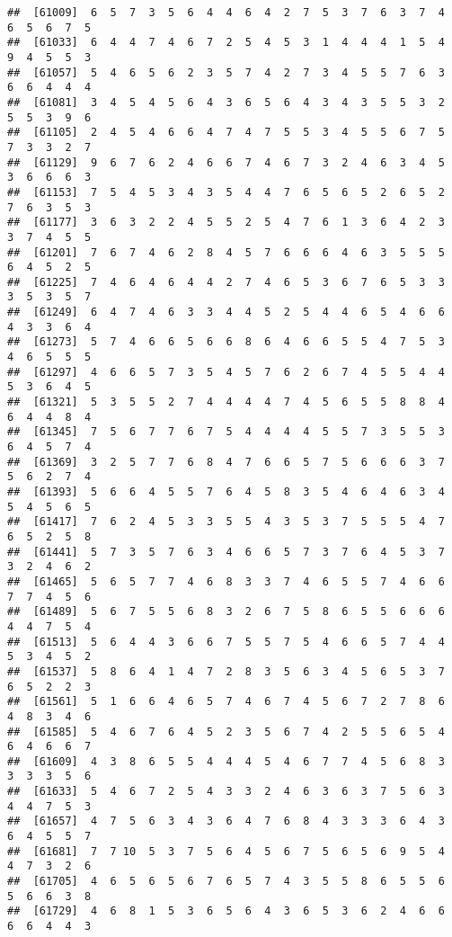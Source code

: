 \documentclass[
]{book}
\begin{document}
\begin{verbatim}
##  [61009]  6  5  7  3  5  6  4  4  6  4  2  7  5  3  7  6  3  7  4  6  5  6  7  5
##  [61033]  6  4  4  7  4  6  7  2  5  4  5  3  1  4  4  4  1  5  4  9  4  5  5  3
##  [61057]  5  4  6  5  6  2  3  5  7  4  2  7  3  4  5  5  7  6  3  6  6  4  4  4
##  [61081]  3  4  5  4  5  6  4  3  6  5  6  4  3  4  3  5  5  3  2  5  5  3  9  6
##  [61105]  2  4  5  4  6  6  4  7  4  7  5  5  3  4  5  5  6  7  5  7  3  3  2  7
##  [61129]  9  6  7  6  2  4  6  6  7  4  6  7  3  2  4  6  3  4  5  3  6  6  6  3
##  [61153]  7  5  4  5  3  4  3  5  4  4  7  6  5  6  5  2  6  5  2  7  6  3  5  3
##  [61177]  3  6  3  2  2  4  5  5  2  5  4  7  6  1  3  6  4  2  3  3  7  4  5  5
##  [61201]  7  6  7  4  6  2  8  4  5  7  6  6  6  4  6  3  5  5  5  6  4  5  2  5
##  [61225]  7  4  6  4  6  4  4  2  7  4  6  5  3  6  7  6  5  3  3  3  5  3  5  7
##  [61249]  6  4  7  4  6  3  3  4  4  5  2  5  4  4  6  5  4  6  6  4  3  3  6  4
##  [61273]  5  7  4  6  6  5  6  6  8  6  4  6  6  5  5  4  7  5  3  4  6  5  5  5
##  [61297]  4  6  6  5  7  3  5  4  5  7  6  2  6  7  4  5  5  4  4  5  3  6  4  5
##  [61321]  5  3  5  5  2  7  4  4  4  4  7  4  5  6  5  5  8  8  4  6  4  4  8  4
##  [61345]  7  5  6  7  7  6  7  5  4  4  4  4  5  5  7  3  5  5  3  6  4  5  7  4
##  [61369]  3  2  5  7  7  6  8  4  7  6  6  5  7  5  6  6  6  3  7  5  6  2  7  4
##  [61393]  5  6  6  4  5  5  7  6  4  5  8  3  5  4  6  4  6  3  4  5  4  5  6  5
##  [61417]  7  6  2  4  5  3  3  5  5  4  3  5  3  7  5  5  5  4  7  6  5  2  5  8
##  [61441]  5  7  3  5  7  6  3  4  6  6  5  7  3  7  6  4  5  3  7  3  2  4  6  2
##  [61465]  5  6  5  7  7  4  6  8  3  3  7  4  6  5  5  7  4  6  6  7  7  4  5  6
##  [61489]  5  6  7  5  5  6  8  3  2  6  7  5  8  6  5  5  6  6  6  4  4  7  5  4
##  [61513]  5  6  4  4  3  6  6  7  5  5  7  5  4  6  6  5  7  4  4  5  3  4  5  2
##  [61537]  5  8  6  4  1  4  7  2  8  3  5  6  3  4  5  6  5  3  7  6  5  2  2  3
##  [61561]  5  1  6  6  4  6  5  7  4  6  7  4  5  6  7  2  7  8  6  4  8  3  4  6
##  [61585]  5  4  6  7  6  4  5  2  3  5  6  7  4  2  5  5  6  5  4  6  4  6  6  7
##  [61609]  4  3  8  6  5  5  4  4  4  5  4  6  7  7  4  5  6  8  3  3  3  3  5  6
##  [61633]  5  4  6  7  2  5  4  3  3  2  4  6  3  6  3  7  5  6  3  4  4  7  5  3
##  [61657]  4  7  5  6  3  4  3  6  4  7  6  8  4  3  3  3  6  4  3  6  4  5  5  7
##  [61681]  7  7 10  5  3  7  5  6  4  5  6  7  5  6  5  6  9  5  4  4  7  3  2  6
##  [61705]  4  6  5  6  5  6  7  6  5  7  4  3  5  5  8  6  5  5  6  5  6  6  3  8
##  [61729]  4  6  8  1  5  3  6  5  6  4  3  6  5  3  6  2  4  6  6  6  6  4  4  3

\end{verbatim}
\end{document}

